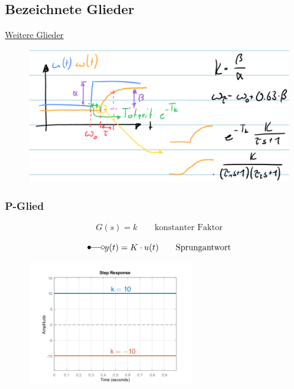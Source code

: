 \documentclass[
  10pt,
  a4paper,
  twocolumn]{article}
\numberwithin{equation}{section}
\begin{document}
\hypertarget{bezeichnete-glieder}{%
\subsection{Bezeichnete Glieder}\label{bezeichnete-glieder}}

\href{https://wiki.ibkastl.de/view/Kategorie:Regelungstechnik}{Weitere
Glieder}

\begin{figure}[H]

{\centering \includegraphics{images/paste-85.png}

}

\end{figure}

\hypertarget{p-glied}{%
\subsubsection{P-Glied}\label{p-glied}}

\[
G(s)=k\qquad \text{konstanter Faktor}
\]

\[
\Laplace y(t)=K\cdot u(t)\qquad\text{Sprungantwort}
\]

\begin{figure}[H]

{\centering \includegraphics[width=7cm,height=\textheight]{images/paste-23.png}

}

\end{figure}
\end{document}
